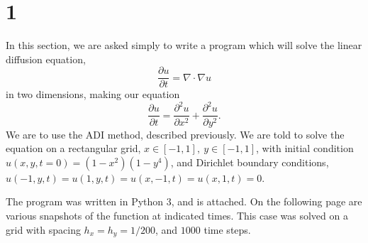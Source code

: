 \documentclass{article}
\begin{document}
\section*{1}
In this section, we are asked simply to write a program which will solve the linear diffusion equation,
\begin{equation}
\frac{\partial u}{\partial t} = \nabla \cdot \nabla u
\end{equation}
in two dimensions, making our equation
\begin{equation}
\frac{\partial u}{\partial t} = \frac{\partial^2 u}{\partial x^2} + \frac{\partial^2 u}{\partial y^2}.
\end{equation}
We are to use the ADI method, described previously.
We are told to solve the equation on a rectangular grid, $x \in [-1,1],~y\in [-1,1]$, with
initial condition $u(x,y,t=0) = (1 - x^2)(1 - y^4) $, and Dirichlet boundary conditions,
$u(-1,y,t) = u(1,y,t) = u(x,-1,t) = u(x,1,t) = 0$.

The program was written in Python 3, and is attached. On the following page are
various snapshots of the function at indicated times. This case was solved on a grid
with spacing $h_x = h_y = 1/200$, and $1000$ time steps.
\end{document}
